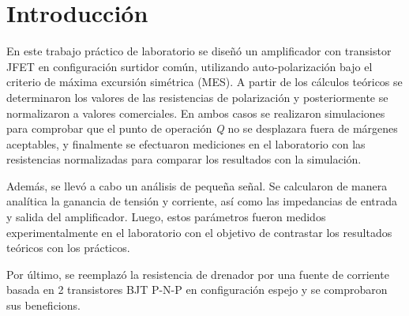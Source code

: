 \chapter{Introducción}

En este trabajo práctico de laboratorio se diseñó un amplificador con transistor JFET en configuración surtidor común, utilizando
auto-polarización bajo el criterio de máxima excursión simétrica (MES). A partir de los cálculos teóricos
se determinaron los valores de las resistencias de polarización y posteriormente se normalizaron a valores comerciales. En ambos
casos se realizaron simulaciones para comprobar que el punto de operación \emph{Q} no se desplazara fuera
de márgenes aceptables, y finalmente se efectuaron mediciones en el laboratorio con las resistencias normalizadas para comparar
los resultados con la simulación.

Además, se llevó a cabo un análisis de pequeña señal. Se calcularon de manera analítica la ganancia de tensión y corriente, así
como las impedancias de entrada y salida del amplificador. Luego, estos parámetros fueron medidos experimentalmente en el laboratorio
con el objetivo de contrastar los resultados teóricos con los prácticos.

Por último, se reemplazó la resistencia de drenador por una fuente de corriente basada en 2 transistores BJT P-N-P en
configuración espejo y se comprobaron sus beneficions.
